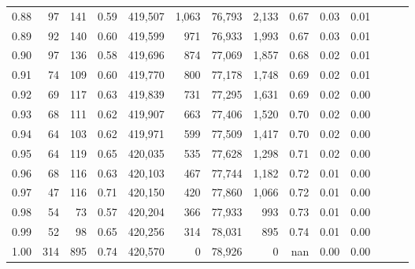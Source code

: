 \begin{tabular}{rrrrrrrrrrrrrr}
0.88 &      97 &    141 &  0.59 &  419,507 &    1,063 &  76,793 &   2,133 &  0.67 &  0.03 &      0.01 \\
0.89 &      92 &    140 &  0.60 &  419,599 &      971 &  76,933 &   1,993 &  0.67 &  0.03 &      0.01 \\
0.90 &      97 &    136 &  0.58 &  419,696 &      874 &  77,069 &   1,857 &  0.68 &  0.02 &      0.01 \\
0.91 &      74 &    109 &  0.60 &  419,770 &      800 &  77,178 &   1,748 &  0.69 &  0.02 &      0.01 \\
0.92 &      69 &    117 &  0.63 &  419,839 &      731 &  77,295 &   1,631 &  0.69 &  0.02 &      0.00 \\
0.93 &      68 &    111 &  0.62 &  419,907 &      663 &  77,406 &   1,520 &  0.70 &  0.02 &      0.00 \\
0.94 &      64 &    103 &  0.62 &  419,971 &      599 &  77,509 &   1,417 &  0.70 &  0.02 &      0.00 \\
0.95 &      64 &    119 &  0.65 &  420,035 &      535 &  77,628 &   1,298 &  0.71 &  0.02 &      0.00 \\
0.96 &      68 &    116 &  0.63 &  420,103 &      467 &  77,744 &   1,182 &  0.72 &  0.01 &      0.00 \\
0.97 &      47 &    116 &  0.71 &  420,150 &      420 &  77,860 &   1,066 &  0.72 &  0.01 &      0.00 \\
0.98 &      54 &     73 &  0.57 &  420,204 &      366 &  77,933 &     993 &  0.73 &  0.01 &      0.00 \\
0.99 &      52 &     98 &  0.65 &  420,256 &      314 &  78,031 &     895 &  0.74 &  0.01 &      0.00 \\
1.00 &     314 &    895 &  0.74 &  420,570 &        0 &  78,926 &       0 &   nan &  0.00 &      0.00 \\
\bottomrule
\end{tabular}

